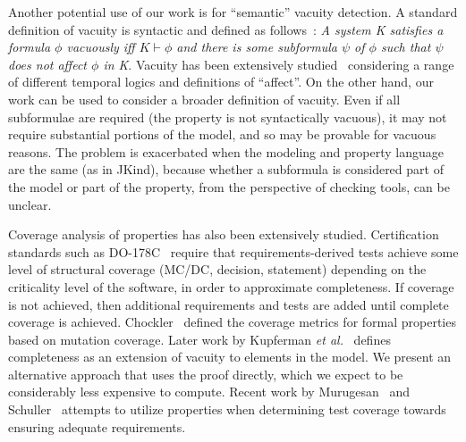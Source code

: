 Another potential use of our work is for ``semantic'' vacuity detection.  A standard definition of vacuity is syntactic and defined as follows~\cite{Kupferman:2006:SCF}: {\em A system K satisfies a formula $\phi$ vacuously iff $K \vdash \phi$ and there is some subformula $\psi$ of $\phi$ such that $\psi$ does not affect $\phi$ in K}.  Vacuity has been extensively studied~\cite{Gurfinkel:2012:RVB,Chockler2008,DBLP:Ben-DavidK13,Kupferman:2006:SCF,Chockler:2007,Beer1997} considering a range of different temporal logics and definitions of ``affect''.  On the other hand, our work can be used to consider a broader definition of vacuity.  Even if all subformulae are required (the property is not syntactically vacuous), it may not require substantial portions of the model, and so may be provable for vacuous reasons.  The problem is exacerbated when the modeling and property language are the same (as in JKind), because whether a subformula is considered part of the model or part of the property, from the perspective of checking tools, can be unclear.

Coverage analysis of properties has also been extensively studied. Certification standards such as DO-178C~\cite{DO178C} require that requirements-derived tests achieve some level of structural coverage (MC/DC, decision, statement) depending on the criticality level of the software, in order to approximate completeness.  If coverage is not achieved, then additional requirements and tests are added until complete coverage is achieved.  Chockler~\cite{chockler_coverage_2003} defined the coverage metrics for formal properties based on mutation coverage.  Later work by Kupferman \textit{et al.}~\cite{Kupferman:2006:SCF} defines completeness as an extension of vacuity to elements in the model.  We present an alternative approach that uses the proof directly, which we expect to be considerably less expensive to compute.  Recent work by Murugesan~\cite{murugesan2015we} and Schuller~\cite{schuler_assessing_2011} attempts to utilize properties when determining test coverage towards ensuring adequate requirements.




\iffalse
\begin{itemize}
    \item MUS's : checked
    \item Work on Alloy: checked
    \item Work that Teme pointed us to : will be added
    \item Anything else Elaheh has found : \%60 checked
\end{itemize}
\fi

